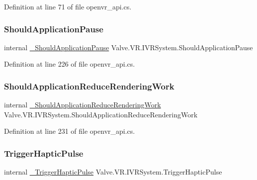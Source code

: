 Definition at line 71 of file openvr\+\_\+api.\+cs.

\mbox{\label{struct_valve_1_1_v_r_1_1_i_v_r_system_aa9fb2748a8d56a66f39629552db1fc66}} 
\subsubsection{\texorpdfstring{ShouldApplicationPause}{ShouldApplicationPause}}
{\footnotesize\ttfamily internal \mbox{\hyperlink{struct_valve_1_1_v_r_1_1_i_v_r_system_ad63c0ab21538f30ce52420c007356f12}{\+\_\+\+Should\+Application\+Pause}} Valve.\+V\+R.\+I\+V\+R\+System.\+Should\+Application\+Pause}



Definition at line 226 of file openvr\+\_\+api.\+cs.

\mbox{\label{struct_valve_1_1_v_r_1_1_i_v_r_system_a24eff068adfd4b8924e9e1224406d14e}} 
\subsubsection{\texorpdfstring{ShouldApplicationReduceRenderingWork}{ShouldApplicationReduceRenderingWork}}
{\footnotesize\ttfamily internal \mbox{\hyperlink{struct_valve_1_1_v_r_1_1_i_v_r_system_a6f55813bd7702e935e3313a50f27fd87}{\+\_\+\+Should\+Application\+Reduce\+Rendering\+Work}} Valve.\+V\+R.\+I\+V\+R\+System.\+Should\+Application\+Reduce\+Rendering\+Work}



Definition at line 231 of file openvr\+\_\+api.\+cs.

\mbox{\label{struct_valve_1_1_v_r_1_1_i_v_r_system_a14c214fd36ef8b882166e9d1f03654c9}} 
\subsubsection{\texorpdfstring{TriggerHapticPulse}{TriggerHapticPulse}}
{\footnotesize\ttfamily internal \mbox{\hyperlink{struct_valve_1_1_v_r_1_1_i_v_r_system_a7d878e9f5dd86b552a79017e9b265b72}{\+\_\+\+Trigger\+Haptic\+Pulse}} Valve.\+V\+R.\+I\+V\+R\+System.\+Trigger\+Haptic\+Pulse}




